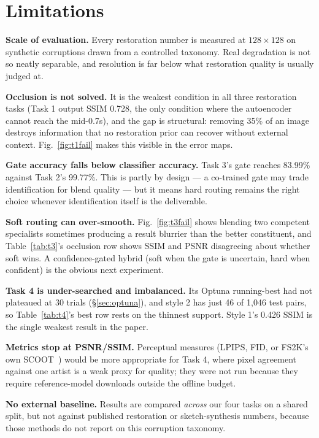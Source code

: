 \documentclass[journal]{IEEEtran}
\begin{document}
\section{Limitations}
\label{sec:limits}

\textbf{Scale of evaluation.} Every restoration number is measured at $128\times128$ on synthetic corruptions drawn from a controlled taxonomy. Real degradation is not so neatly separable, and resolution is far below what restoration quality is usually judged at.

\textbf{Occlusion is not solved.} It is the weakest condition in all three restoration tasks (Task 1 output SSIM 0.728, the only condition where the autoencoder cannot reach the mid-0.7s), and the gap is structural: removing 35\% of an image destroys information that no restoration prior can recover without external context. Fig.~\ref{fig:t1fail} makes this visible in the error maps.

\textbf{Gate accuracy falls below classifier accuracy.} Task 3's gate reaches 83.99\% against Task 2's 99.77\%. This is partly by design --- a co-trained gate may trade identification for blend quality --- but it means hard routing remains the right choice whenever identification itself is the deliverable.

\textbf{Soft routing can over-smooth.} Fig.~\ref{fig:t3fail} shows blending two competent specialists sometimes producing a result blurrier than the better constituent, and Table~\ref{tab:t3}'s occlusion row shows SSIM and PSNR disagreeing about whether soft wins. A confidence-gated hybrid (soft when the gate is uncertain, hard when confident) is the obvious next experiment.

\textbf{Task 4 is under-searched and imbalanced.} Its Optuna running-best had not plateaued at 30 trials (\S\ref{sec:optuna}), and style 2 has just 46 of 1{,}046 test pairs, so Table~\ref{tab:t4}'s best row rests on the thinnest support. Style 1's 0.426 SSIM is the single weakest result in the paper.

\textbf{Metrics stop at PSNR/SSIM.} Perceptual measures (LPIPS, FID, or FS2K's own SCOOT~\cite{fan2019scoot}) would be more appropriate for Task 4, where pixel agreement against one artist is a weak proxy for quality; they were not run because they require reference-model downloads outside the offline budget.

\textbf{No external baseline.} Results are compared \emph{across} our four tasks on a shared split, but not against published restoration or sketch-synthesis numbers, because those methods do not report on this corruption taxonomy.
\end{document}
